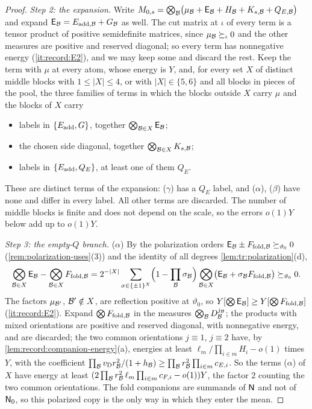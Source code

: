 \begin{proof}
\emph{Step 2: the expansion.} Write
$M_{0,s}=\bigotimes_\mathcal B\bigl(\mu_\mathcal B+\mathsf E_\mathcal B+H_\mathcal B+K_{s,\mathcal B}+Q_{E,\mathcal B}\bigr)$ and
expand $\mathsf E_\mathcal B=E_{{\rm add},\mathcal B}+G_\mathcal B$ as well. The cut matrix at $\iota$ of
every term is a tensor product of positive semidefinite matrices, since
$\mu_\mathcal B\succeq_\iota0$ and the other measures are positive and reserved diagonal;
so every term has nonnegative energy (\ref{it:record:E2}), and we may keep
some and discard the rest. Keep the term with $\mu$ at every atom, whose
energy is $Y$, and, for every set $X$ of distinct middle blocks with
$1\le|X|\le4$, or with $|X|\in\{5,6\}$ and all blocks in pieces of the pool, the
three families of terms in which the blocks outside $X$ carry $\mu$ and the
blocks of $X$ carry
\begin{itemize}
\item[($\alpha$)] labels in $\{E_{\rm add},G\}$, together
 $\bigotimes_{\mathcal B\in X}\mathsf E_\mathcal B$;
\item[($\beta$)] the chosen side diagonal, together $\bigotimes_{\mathcal B\in X}K_{s,\mathcal B}$;
\item[($\gamma$)] labels in $\{E_{\rm add},Q_E\}$, at least one of them $Q_E$.
\end{itemize}
These are distinct terms of the expansion: ($\gamma$) has a $Q_E$ label, and
($\alpha$), ($\beta$) have none and differ in every label. All other terms are
discarded. The number of middle blocks is finite and does not depend on the
scale, so the errors $o(1)Y$ below add up to $o(1)Y$.

\emph{Step 3: the empty-$Q$ branch.} ($\alpha$) By the polarization orders
$\mathsf E_\mathcal B\pm F_{{\rm fold},\mathcal B}\succeq_{\vartheta_0}0$
(\cref{rem:polarization-uses}(3)) and the identity of all degrees
\cref{lem:tr:polarization}(d),
\[
 \bigotimes_{\mathcal B\in X}\mathsf E_\mathcal B-\bigotimes_{\mathcal B\in X}F_{{\rm fold},\mathcal B}
 =2^{-|X|}\sum_{\sigma\in\{\pm1\}^X}\Bigl(1-\prod_\mathcal B\sigma_\mathcal B\Bigr)
 \bigotimes_{\mathcal B\in X}\bigl(\mathsf E_\mathcal B+\sigma_\mathcal B F_{{\rm fold},\mathcal B}\bigr)
 \succeq_{\vartheta_0}0 .
\]
The factors $\mu_{\mathcal B'}$, $\mathcal B'\notin X$, are reflection positive at
$\vartheta_0$, so $Y[\bigotimes\mathsf E_\mathcal B]\ge Y[\bigotimes F_{{\rm fold},\mathcal B}]$
(\ref{it:record:E2}). Expand $\bigotimes F_{{\rm fold},\mathcal B}$ in the measures
$\bigotimes_\mathcal B D^{j_\mathcal B}_\mathcal B$; the products with mixed orientations are positive
and reserved diagonal, with nonnegative energy, and are discarded; the two
common orientations $j\equiv1$, $j\equiv2$ have, by
\cref{lem:record:companion-energy}(a), energies at least $\ell_m/\prod_{i\in m}H_i-o(1)$
times $Y$, with the coefficient $\prod_\mathcal B v_{\rm D}r_\mathcal B^2/(1+h_\mathcal B)\ge
\prod_\mathcal B r_\mathcal B^2\prod_{i\in m}c_{E,i}$. So the terms ($\alpha$) of $X$ have energy at
least $(2\prod_\mathcal B r_\mathcal B^2\,\ell_m\prod_{i\in m}c_{F,i}-o(1))Y$, the factor $2$ counting
the two common orientations. The fold companions are summands of $\mathsf N$ and not
of $\mathsf N_0$, so this polarized copy is the only way in which they enter the
mean.


\end{proof}
